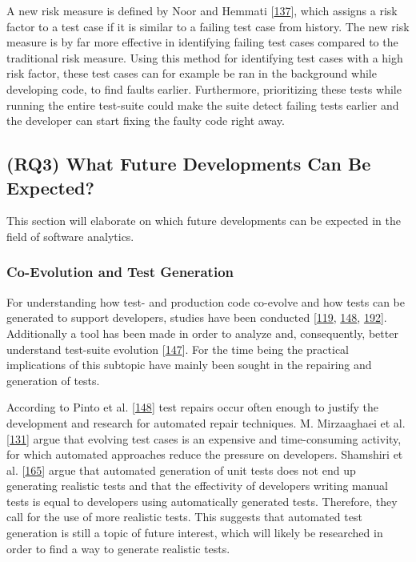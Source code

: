 \documentclass[]{book}
\begin{document}
A new risk measure is defined by Noor and Hemmati
{[}\protect\hyperlink{ref-noor2015test}{137}{]}, which assigns a risk
factor to a test case if it is similar to a failing test case from
history. The new risk measure is by far more effective in identifying
failing test cases compared to the traditional risk measure. Using this
method for identifying test cases with a high risk factor, these test
cases can for example be ran in the background while developing code, to
find faults earlier. Furthermore, prioritizing these tests while running
the entire test-suite could make the suite detect failing tests earlier
and the developer can start fixing the faulty code right away.

\subsection{(RQ3) What Future Developments Can Be
Expected?}\label{rq3-what-future-developments-can-be-expected}

This section will elaborate on which future developments can be expected
in the field of software analytics.

\subsubsection{Co-Evolution and Test
Generation}\label{co-evolution-and-test-generation}

For understanding how test- and production code co-evolve and how tests
can be generated to support developers, studies have been conducted
{[}\protect\hyperlink{ref-marsavina2014}{119},
\protect\hyperlink{ref-pinto2012understanding}{148},
\protect\hyperlink{ref-zaidman2011studying}{192}{]}. Additionally a tool
has been made in order to analyze and, consequently, better understand
test-suite evolution {[}\protect\hyperlink{ref-pinto2013}{147}{]}. For
the time being the practical implications of this subtopic have mainly
been sought in the repairing and generation of tests.

According to Pinto et al.
{[}\protect\hyperlink{ref-pinto2012understanding}{148}{]} test repairs
occur often enough to justify the development and research for automated
repair techniques. M. Mirzaaghaei et al.
{[}\protect\hyperlink{ref-supportingtestsuite}{131}{]} argue that
evolving test cases is an expensive and time-consuming activity, for
which automated approaches reduce the pressure on developers. Shamshiri
et al. {[}\protect\hyperlink{ref-shamshiri2018automatically}{165}{]}
argue that automated generation of unit tests does not end up generating
realistic tests and that the effectivity of developers writing manual
tests is equal to developers using automatically generated tests.
Therefore, they call for the use of more realistic tests. This suggests
that automated test generation is still a topic of future interest,
which will likely be researched in order to find a way to generate
realistic tests.
\end{document}
